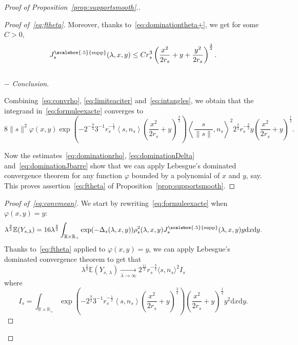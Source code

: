 \documentclass[10pt]{amsart}
\theoremstyle{definition}\newtheorem{defi}[theo]{Definition}\newtheorem{rema}[theo]{Remark}\newtheorem{exam}[theo]{Example}\newtheorem{exem}[theo]{Example}\newtheorem{nota}[theo]{Notation}
\newcommand{\dd}{\mathrm{d}}
\newcommand{\E}{\mathbb{E}}
\newcommand{\R}{\mathbb{R}}
\DeclareMathOperator{\supp}{\scalebox{.5}{supp}}
\newcommand{\pass}{\vspace{0.3cm}\noindent}
\newcommand{\noi}{\noindent}
\newenvironment*{prooff}{\begin{proof}}{\let\qed\relax\end{proof}}
\newenvironment*{lastprooff}{\begin{proof}}{\end{proof}}
\begin{document}
\begin{proof}[{Proof of Proposition~\ref{prop:supportsmooth}.}]
\begin{prooff}[{Proof of~\eqref{eq:ftheta}}]
Moreover, thanks to~\eqref{eq:dominationtheta+}, we get for some $C>0$,
\begin{equation}\label{eq:dominationJbarre}
J^{\supp}_{s}(\lambda,x,y)\le C r_s^3\left(\frac{x^2}{2r_s}+y+\frac{y^2}{2r_s}\right)^{\frac{3}{2}}.
\end{equation}\\
$-$ \emph{Conclusion}.

Combining~\eqref{eq:convrho}, \eqref{eq:limiteaciter} and~\eqref{eq:intangles}, we obtain that the integrand in~\eqref{eq:formuleexacte} converges to
\begin{equation*}
8\|s\|^2\varphi(x,y)\exp\!\left(-2^{-\frac{9}{2}}3^{-1}r_{s}^{-\frac1{2}}\left\langle s,n_s\right\rangle\left(\frac{x^2}{2r_{s}}+y\right)^{\frac{3}{2}} \right)\left\langle\frac{s}{\|s\|},n_s\!\right\rangle^2 2^{\frac{3}{2}}r_s^{-\frac{3}{2}}y\left(\frac{x^2}{2r_s}+y\!\right)^{\frac1{2}}.
\end{equation*}

Now the estimates~\eqref{eq:dominationrho}, \eqref{eq:dominationDelta} and~\eqref{eq:dominationJbarre} show that we can apply Lebesgue's dominated convergence theorem for any function $\varphi$ bounded by a polynomial of $x$ and $y$, say. This proves assertion~\eqref{eq:ftheta} of Proposition~\ref{prop:supportsmooth}.
\end{prooff}

\begin{lastprooff}[{Proof of~\eqref{eq:convmean}}]
We start by rewriting~\eqref{eq:formuleexacte} when $\varphi(x,y)=y$:
\begin{equation}\label{eq:formuleYexacte}
\lambda^{\frac{2}{3}}\E(Y_{s,\lambda}) = 16\lambda^{\frac23}\int_{\R\times \R_+}\exp(-\Delta_s(\lambda,x,y))\rho_s^2(\lambda,x,y)J^{\supp}_s(\lambda,x,y)y\dd x \dd y.
\end{equation}
Thanks to~\eqref{eq:ftheta} applied to $\varphi(x,y)=y$, we can apply Lebesgue's dominated convergence theorem to get that
\begin{equation*}\label{eq:premiereformule}
\lambda^{\frac{2}{3}}\E(Y_{s,\,\lambda}) \underset{\lambda\to\infty}{\longrightarrow} 2^{\frac{11}{2}} r_s^{-\frac{3}{2}}\langle s,n_s\rangle^2I_s
\end{equation*}
where
\begin{equation*}\label{eq:defIs}
I_s =\int_{\R\times\R_+}\exp\left(-2^{\frac{9}{2}} 3^{-1}r_s^{-\frac1{2}}\left\langle s,n_s\right\rangle \left(\frac{x^2}{2r_s}+y\right)^{\frac{3}{2}}\right)\left(\frac{x^2}{2r_s}+y\right)^{\frac1{2}}y^2 \dd x \dd y.
\end{equation*}


\end{lastprooff}
\end{proof}
\end{document}

